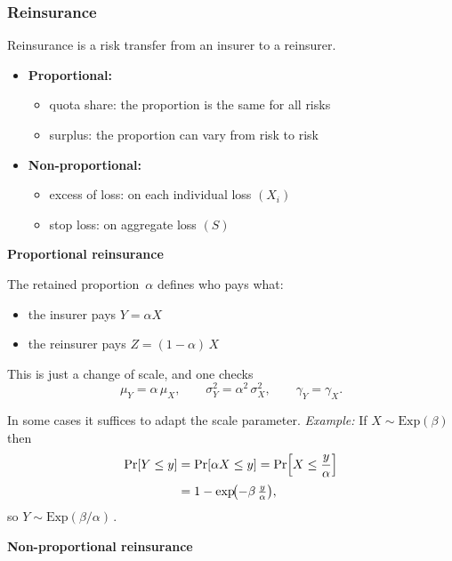 \documentclass{article}
\begin{document}
\subsubsection{Reinsurance}
Reinsurance is a risk transfer from an insurer to a reinsurer.

\begin{itemize}
    \item \textbf{Proportional:}
    \begin{itemize}
        \item quota share: the proportion is the same for all risks
        \item surplus: the proportion can vary from risk to risk
    \end{itemize}
    \item \textbf{Non-proportional:}
    \begin{itemize}
        \item excess of loss: on each individual loss $(X_i)$
        \item stop loss: on aggregate loss $(S)$
    \end{itemize}
\end{itemize}



\noindent \textbf{Proportional reinsurance}

The retained proportion~$\alpha$ defines who pays what:
\begin{itemize}
  \item the insurer pays $Y = \alpha X$
  \item the reinsurer pays $Z = (1 - \alpha)\,X$
\end{itemize}

This is just a change of scale, and one checks
\[
  \mu_Y = \alpha\,\mu_X,\qquad
  \sigma_Y^2 = \alpha^2\,\sigma_X^2,\qquad
  \gamma_Y = \gamma_X.
\]

In some cases it suffices to adapt the scale parameter.  \emph{Example:}
If $X\sim\mathrm{Exp}(\beta)$ then
\begin{align*}
  \Pr[Y \le y]
    &= \Pr[\alpha X \le y]
    = \Pr\Bigl[X \le \frac{y}{\alpha}\Bigr] \\[0.5ex]
    &= 1 - \exp\!\bigl(-\beta\,\tfrac{y}{\alpha}\bigr),
\end{align*}
so $Y\sim\mathrm{Exp}(\beta/\alpha)\,$.


\pagebreak

\noindent \textbf{Non-proportional reinsurance}
\end{document}
